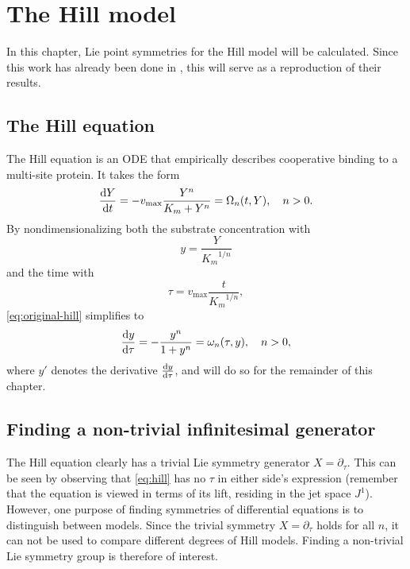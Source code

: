 \chapter{The Hill model}

In this chapter, Lie point symmetries for the Hill model will be calculated.
Since this work has already been done in \cite{ohlsson2020symmetry}, this will serve as a reproduction of their results.

\section{The Hill equation}

The Hill equation is an ODE that empirically describes cooperative binding to a multi-site protein.
It takes the form
\begin{equation} \label{eq:original-hill}
  \dv{Y}{t} = - v_\text{max} \frac{Y^n}{K_m + Y^n} = \Omega_n(t, Y), \quad
  n > 0.
\end{equation}
By nondimensionalizing both the substrate concentration with
\begin{equation}
  y = \frac{Y}{{K_m}^{1/n}}
\end{equation}
and the time with
\begin{equation}
  \tau = v_\text{max} \frac{t}{{K_m}^{1/n}},
\end{equation}
\cref{eq:original-hill} simplifies to
\begin{equation} \label{eq:hill}
  \dv{y}{\tau} = - \frac{y^n}{1 + y^n} = \omega_n(\tau, y), \quad
  n > 0,
\end{equation}
where \(y'\) denotes the derivative \(\dv{y}{\tau}\), and will do so for the remainder of this chapter.

\section{Finding a non-trivial infinitesimal generator}

The Hill equation clearly has a trivial Lie symmetry generator \(X=\partial_\tau\).
This can be seen by observing that \cref{eq:hill} has no \(\tau\) in either side's expression (remember that the equation is viewed in terms of its lift, residing in the jet space \(J^1\)).
However, one purpose of finding symmetries of differential equations is to distinguish between models.
Since the trivial symmetry \(X=\partial_\tau\) holds for all \(n\), it can not be used to compare different degrees of Hill models.
Finding a non-trivial Lie symmetry group is therefore of interest.

